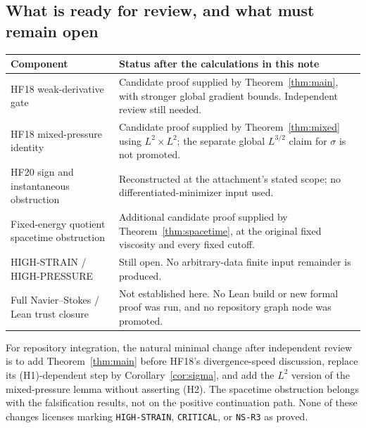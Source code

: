 \documentclass[11pt,a4paper]{article}
\theoremstyle{definition}
\newcommand{\repo}[1]{\texttt{#1}}
\begin{document}
\subsection{What is ready for review, and what must remain open}
\begin{center}
\small
\begin{tabular}{@{}>{\raggedright\arraybackslash}p{}>{\raggedright\arraybackslash}p{}@{}}\toprule
Component & Status after the calculations in this note\\\midrule
HF18 weak-derivative gate & Candidate proof supplied by Theorem~\ref{thm:main}, with stronger global gradient bounds. Independent review still needed.\\[4pt]
HF18 mixed-pressure identity & Candidate proof supplied by Theorem~\ref{thm:mixed} using $L^2\times L^2$; the separate global $L^{3/2}$ claim for $\sigma$ is not promoted.\\[4pt]
HF20 sign and instantaneous obstruction & Reconstructed at the attachment's stated scope; no differentiated-minimizer input used.\\[4pt]
Fixed-energy quotient spacetime obstruction & Additional candidate proof supplied by Theorem~\ref{thm:spacetime}, at the original fixed viscosity and every fixed cutoff.\\[4pt]
HIGH-STRAIN / HIGH-PRESSURE & Still open. No arbitrary-data finite input remainder is produced.\\[4pt]
Full Navier--Stokes / Lean trust closure & Not established here. No Lean build or new formal proof was run, and no repository graph node was promoted.\\\bottomrule
\end{tabular}
\end{center}

For repository integration, the natural minimal change after independent review is to add Theorem~\ref{thm:main} before HF18's divergence-speed discussion, replace its (H1)-dependent step by Corollary~\ref{cor:sigma}, and add the $L^2$ version of the mixed-pressure lemma without asserting (H2). The spacetime obstruction belongs with the falsification results, not on the positive continuation path. None of these changes licenses marking \repo{HIGH-STRAIN}, \repo{CRITICAL}, or \repo{NS-R3} as proved.
\end{document}
